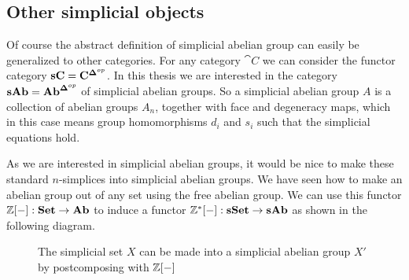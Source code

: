 
\subsection{Other simplicial objects}
Of course the abstract definition of simplicial abelian group can easily be generalized to other categories. For any category $\cat{C}$ we can consider the functor category $\mathbf{sC} = \mathbf{C}^{\mathbf{\Delta}^{op}}$. In this thesis we are interested in the category $\mathbf{sAb} = \mathbf{Ab}^{\mathbf{\Delta}^{op}}$ of simplicial abelian groups. So a simplicial abelian group $A$ is a collection of abelian groups $A_n$, together with face and degeneracy maps, which in this case means group homomorphisms $d_i$ and $s_i$ such that the simplicial equations hold.

As we are interested in simplicial abelian groups, it would be nice to make these standard $n$-simplices into simplicial abelian groups. We have seen how to make an abelian group out of any set using the free abelian group. We can use this functor $\mathbb{Z}[-] : \mathbf{Set} \to \mathbf{Ab}$ to induce a functor $\mathbb{Z}^\ast[-] : \mathbf{sSet} \to \mathbf{sAb}$ as shown in the following diagram.
\begin{figure}[h!]
	\caption{The simplicial set $X$ can be made into a simplicial abelian group $X'$ by postcomposing with $\mathbb{Z}[-]$}
	\label{fig:diagram_Z}
\end{figure}

